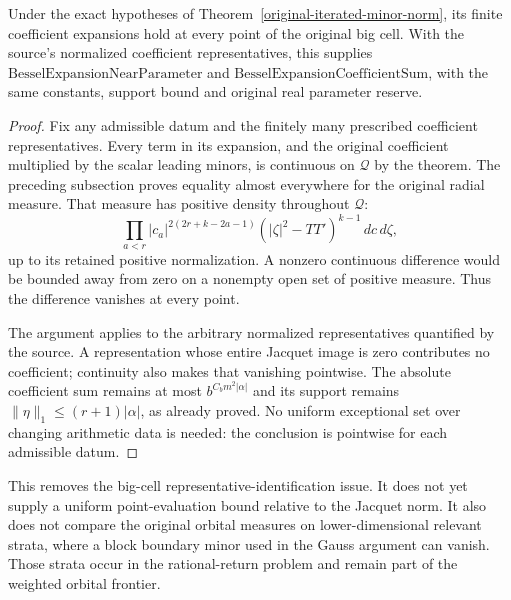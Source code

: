 \begin{corollary}\label{original-pointwise-pieri-expansions}
Under the exact hypotheses of
Theorem~\ref{original-iterated-minor-norm}, its finite coefficient
expansions hold at every point of the original big cell.
With the source's normalized coefficient representatives, this
supplies $\mathrm{BesselExpansionNearParameter}$ and
$\mathrm{BesselExpansionCoefficientSum}$, with the same constants,
support bound and original real parameter reserve.
\end{corollary}

\begin{proof}
Fix any admissible datum and the finitely many prescribed
coefficient representatives. Every term in its expansion,
and the original coefficient multiplied by the scalar leading
minors, is continuous on $\mathcal Q$ by the theorem.
The preceding subsection proves equality almost everywhere for
the original radial measure. That measure has positive density
throughout $\mathcal Q$:
\[
 \prod_{a<r}|c_a|^{2(2r+k-2a-1)}
                    (|\zeta|^2-TT')^{k-1}\,dc\,d\zeta ,
\]
up to its retained positive normalization.
A nonzero continuous difference would be bounded away from zero
on a nonempty open set of positive measure. Thus the difference
vanishes at every point.

The argument applies to the arbitrary normalized representatives
quantified by the source. A representation whose entire Jacquet
image is zero contributes no coefficient; continuity also makes
that vanishing pointwise. The absolute coefficient sum remains
at most $b^{C_bm^2|\alpha|}$ and its support remains
$\|\eta\|_1\le(r+1)|\alpha|$, as already proved.
No uniform exceptional set over changing arithmetic data is needed:
the conclusion is pointwise for each admissible datum.
\end{proof}

This removes the big-cell representative-identification issue.
It does not yet supply a uniform point-evaluation bound relative
to the Jacquet norm. It also does not compare the original
orbital measures on lower-dimensional relevant strata, where a
block boundary minor used in the Gauss argument can vanish.
Those strata occur in the rational-return problem and remain
part of the weighted orbital frontier.
